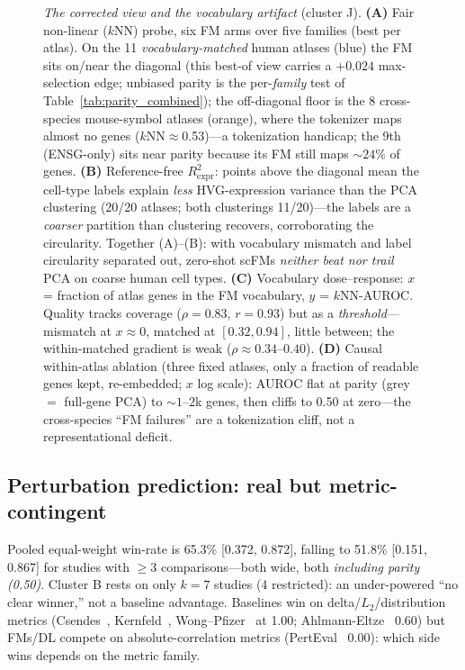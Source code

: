 \documentclass[journal]{IEEEtran}
\begin{document}
\begin{figure}[!tbp]\centering
\resizebox{\textwidth}{!}{}
\caption{\emph{The corrected view and the vocabulary artifact} (cluster J). \textbf{(A)} Fair non-linear ($k$NN) probe, six FM arms over five families (best per atlas). On the 11 \emph{vocabulary-matched} human atlases (blue) the FM sits on/near the diagonal (this best-of view carries a $+0.024$ max-selection edge; unbiased parity is the per-\emph{family} test of Table~\ref{tab:parity_combined}); the off-diagonal floor is the 8 cross-species mouse-symbol atlases (orange), where the tokenizer maps almost no genes ($k$NN${\approx}$0.53)---a tokenization handicap; the 9th (ENSG-only) sits near parity because its FM still maps ${\sim}24\%$ of genes. \textbf{(B)} Reference-free $R^2_{\mathrm{expr}}$: points above the diagonal mean the cell-type labels explain \emph{less} HVG-expression variance than the PCA clustering (20/20 atlases; both clusterings 11/20)---the labels are a \emph{coarser} partition than clustering recovers, corroborating the circularity. Together (A)--(B): with vocabulary mismatch and label circularity separated out, zero-shot scFMs \emph{neither beat nor trail} PCA on coarse human cell types. \textbf{(C)} Vocabulary dose--response: $x$ = fraction of atlas genes in the FM vocabulary, $y$ = $k$NN-AUROC. Quality tracks coverage ($\rho=0.83$, $r=0.93$) but as a \emph{threshold}---mismatch at $x\!\approx\!0$, matched at $[0.32,0.94]$, little between; the within-matched gradient is weak ($\rho\approx0.34$--$0.40$). \textbf{(D)} Causal within-atlas ablation (three fixed atlases, only a fraction of readable genes kept, re-embedded; $x$ log scale): AUROC flat at parity (grey $=$ full-gene PCA) to ${\sim}1$--$2$k genes, then cliffs to 0.50 at zero---the cross-species ``FM failures'' are a tokenization cliff, not a representational deficit.}\label{fig:fair}\end{figure}

\subsection{Perturbation prediction: real but metric-contingent}
Pooled equal-weight win-rate is 65.3\% [0.372, 0.872], falling to 51.8\% [0.151, 0.867] for studies with $\geq$3 comparisons---both wide, both \emph{including parity (0.50)}. Cluster B rests on only $k{=}7$ studies (4 restricted): an under-powered ``no clear winner,'' not a baseline advantage. Baselines win on delta/$L_2$/distribution metrics (Csendes~\cite{csendes2025}, Kernfeld~\cite{kernfeld2025}, Wong--Pfizer~\cite{wongpfizer2025} at 1.00; Ahlmann-Eltze~\cite{ahlmann2025} 0.60) but FMs/DL compete on absolute-correlation metrics (PertEval~\cite{perteval2024} 0.00): which side wins depends on the metric family.
\end{document}
